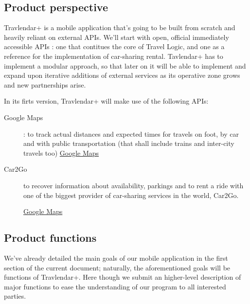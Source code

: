 \subsection{Product perspective}

Travlendar+ is a mobile application that’s going to be built from scratch and heavily reliant on external APIs. 
We’ll start with open, official immediately accessible APIs : one that contitues the core of Travel Logic, and one as a reference for the implementation of car-sharing rental. 
Tavlendar+ has to implement a modular approach, so that later on it will be able to implement and expand upon iterative additions of external services as its operative zone grows and new partnerships arise.

In its firts version, Travlendar+ will make use of the following APIs:
\begin{description}

	\item[Google Maps] : to track actual distances and expected times for travels on foot, by car and with public transportation (that shall include trains and inter-city travels too) 
	\href{https://developers.google.com/maps/}{Google Maps}
	\item[Car2Go] to recover information about availability, parkings and to rent a ride with one of the biggest provider of car-sharing services in the world, Car2Go.
	
	\href{https://developers.google.com/maps/}{Google Maps}


\end{description}


			
\subsection{Product functions}
	
 We’ve already detailed the main goals of our mobile application in the first section of the current document; naturally, the aforementioned goals will be functions of Travlendar+.
Here though we submit an higher-level description of major functions to ease the understanding of our program to all interested parties.
		
